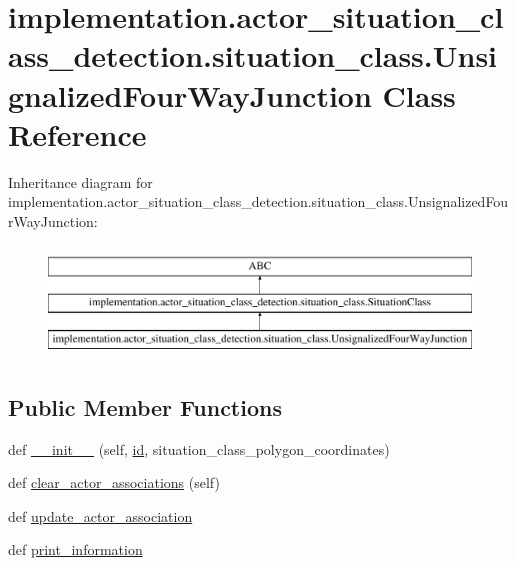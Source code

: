 \hypertarget{classimplementation_1_1actor__situation__class__detection_1_1situation__class_1_1_unsignalized_four_way_junction}{}\section{implementation.\+actor\+\_\+situation\+\_\+class\+\_\+detection.\+situation\+\_\+class.\+Unsignalized\+Four\+Way\+Junction Class Reference}
\label{classimplementation_1_1actor__situation__class__detection_1_1situation__class_1_1_unsignalized_four_way_junction}
Inheritance diagram for implementation.\+actor\+\_\+situation\+\_\+class\+\_\+detection.\+situation\+\_\+class.\+Unsignalized\+Four\+Way\+Junction\+:\begin{figure}[H]
\begin{center}
\leavevmode
\includegraphics[height=3.000000cm]{classimplementation_1_1actor__situation__class__detection_1_1situation__class_1_1_unsignalized_four_way_junction}
\end{center}
\end{figure}
\subsection*{Public Member Functions}
\begin{DoxyCompactItemize}
\item 
def \hyperlink{classimplementation_1_1actor__situation__class__detection_1_1situation__class_1_1_unsignalized_four_way_junction_a2b3ddd1bcbad64a16e35bbe4ef1e8144}{\+\_\+\+\_\+init\+\_\+\+\_\+} (self, \hyperlink{classimplementation_1_1actor__situation__class__detection_1_1situation__class_1_1_situation_class_a27d4d3259b8bb96107692e2b936ce801}{id}, situation\+\_\+class\+\_\+polygon\+\_\+coordinates)
\item 
def \hyperlink{classimplementation_1_1actor__situation__class__detection_1_1situation__class_1_1_unsignalized_four_way_junction_a0847bd9feb8f04f055599ac084c8228e}{clear\+\_\+actor\+\_\+associations} (self)
\item 
def \hyperlink{classimplementation_1_1actor__situation__class__detection_1_1situation__class_1_1_unsignalized_four_way_junction_a9ac1411f1951cd2b3c989cff2c3e73e4}{update\+\_\+actor\+\_\+association}
\item 
def \hyperlink{classimplementation_1_1actor__situation__class__detection_1_1situation__class_1_1_unsignalized_four_way_junction_a5e0cc68aa2910a3c2b087b5226efec79}{print\+\_\+information}
\end{DoxyCompactItemize}

